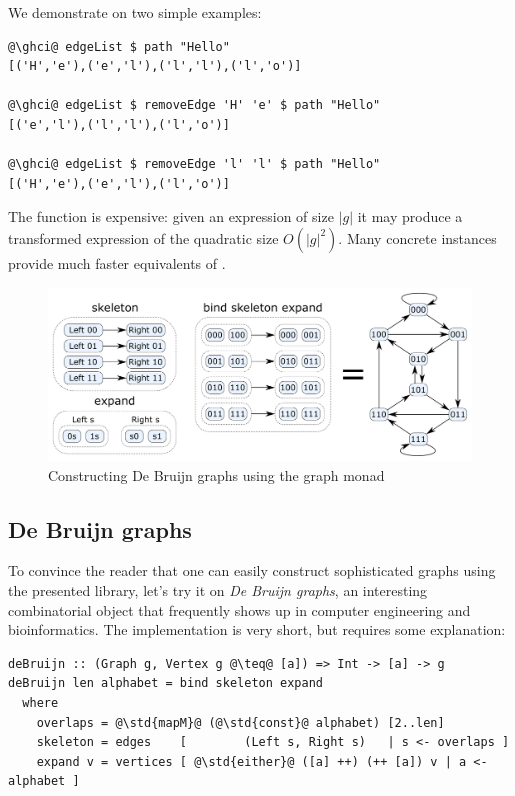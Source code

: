 We demonstrate  on two simple examples:
\begin{verbatim}
@\ghci@ edgeList $ path "Hello"
[('H','e'),('e','l'),('l','l'),('l','o')]

@\ghci@ edgeList $ removeEdge 'H' 'e' $ path "Hello"
[('e','l'),('l','l'),('l','o')]

@\ghci@ edgeList $ removeEdge 'l' 'l' $ path "Hello"
[('H','e'),('e','l'),('l','o')]
\end{verbatim}

\noindent
The  function is expensive: given an expression of size $|g|$
it may produce a transformed expression of the quadratic size $O(|g|^2)$. Many
concrete  instances provide much faster equivalents of .

\begin{figure}
\centerline{\includegraphics[scale=0.3]{fig/De-Bruijn-construction.pdf}}
\vspace{-4mm}
\caption{Constructing De Bruijn graphs using the graph monad\label{fig-de-bruijn}}
\vspace{-4mm}
\end{figure}


\subsection{De Bruijn graphs}

To convince the reader that one can easily construct sophisticated graphs using
the presented library, let's try it on \emph{De Bruijn graphs}, an interesting
combinatorial object that frequently shows up in computer engineering and
bioinformatics. The implementation is very short, but requires some explanation:

\begin{verbatim}
deBruijn :: (Graph g, Vertex g @\teq@ [a]) => Int -> [a] -> g
deBruijn len alphabet = bind skeleton expand
  where
    overlaps = @\std{mapM}@ (@\std{const}@ alphabet) [2..len]
    skeleton = edges    [        (Left s, Right s)   | s <- overlaps ]
    expand v = vertices [ @\std{either}@ ([a] ++) (++ [a]) v | a <- alphabet ]
\end{verbatim}

